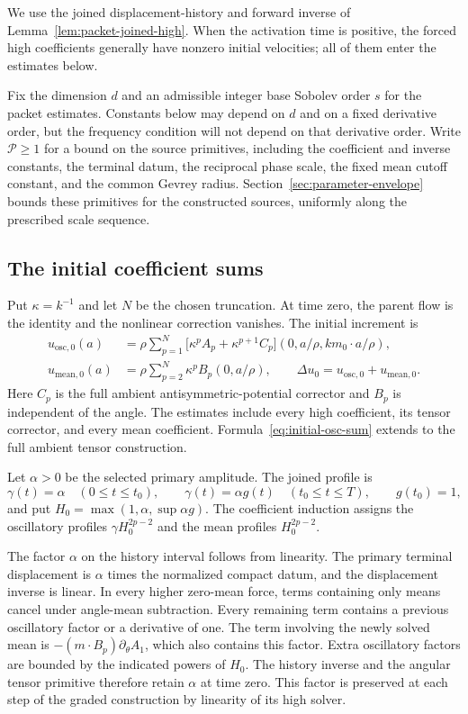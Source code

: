 \documentclass[11pt]{article}
\theoremstyle{definition}
\begin{document}
We use the joined displacement-history and forward inverse of
Lemma~\ref{lem:packet-joined-high}. When the activation time is positive,
the forced high coefficients generally have nonzero initial velocities;
all of them enter the estimates below.

Fix the dimension $d$ and an admissible integer base Sobolev order $s$ for the
packet estimates. Constants below may depend on $d$ and on a fixed
derivative order, but the frequency condition will not depend on that
derivative order. Write $\mathcal P\ge1$ for a bound on the source primitives,
including the coefficient and inverse constants, the terminal datum, the
reciprocal phase scale, the fixed mean cutoff constant, and the common Gevrey
radius. Section~\ref{sec:parameter-envelope} bounds these primitives for the
constructed sources, uniformly along the prescribed scale sequence.

\subsection{The initial coefficient sums}
Put $\kappa=k^{-1}$ and let $N$ be the chosen truncation. At time zero,
the parent flow is the identity and the nonlinear correction vanishes.
The initial increment is
\begin{align}
 u_{\mathrm{osc},0}(a)
 &=\rho\sum_{p=1}^{N}
    \bigl[\kappa^p A_p+\kappa^{p+1}C_p\bigr]
       (0,a/\rho,km_0\cdot a/\rho),\label{eq:initial-osc-sum}\\
 u_{\mathrm{mean},0}(a)
 &=\rho\sum_{p=2}^{N}\kappa^p B_p(0,a/\rho),
 \qquad
 \Delta u_0=u_{\mathrm{osc},0}+u_{\mathrm{mean},0}.
 \label{eq:initial-mean-sum}
\end{align}
Here $C_p$ is the full ambient antisymmetric-potential corrector and $B_p$
is independent of the angle. The estimates include every high coefficient, its tensor corrector,
and every mean coefficient.
Formula~\eqref{eq:initial-osc-sum} extends
\cite[\S3.9, (3.60)]{OAI} to the full ambient tensor construction.

Let $\alpha>0$ be the selected primary amplitude. The joined profile is
\[
 \gamma(t)=\alpha\quad(0\le t\le t_0),\qquad
 \gamma(t)=\alpha g(t)\quad(t_0\le t\le T),\qquad g(t_0)=1,
\]
and put $H_0=\max(1,\alpha,\sup\alpha g)$. The coefficient induction
assigns the oscillatory profiles $\gamma H_0^{2p-2}$ and the mean profiles
$H_0^{2p-2}$.

The factor $\alpha$ on the history interval follows from linearity.
The primary terminal displacement is $\alpha$ times the normalized compact
datum, and the displacement inverse is linear. In every higher zero-mean
force, terms containing only means cancel under angle-mean subtraction.
Every remaining term contains a previous oscillatory factor or a derivative
of one. The term involving the newly solved mean is
$-(m\cdot B_p)\partial_\theta A_1$, which also contains this factor.
Extra oscillatory factors are bounded by the indicated powers of $H_0$.
The history inverse and the angular tensor primitive therefore
retain $\alpha$ at time zero. This factor is preserved at each step of the graded construction
by linearity of its high solver.
\end{document}
